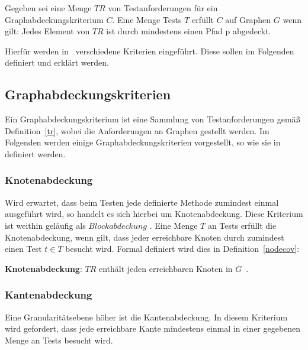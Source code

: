 \begin{definition}
    Gegeben sei eine Menge $TR$ von Testanforderungen für ein Graphabdeckungskriterium $C$.
    Eine Menge Tests $T$ erfüllt $C$ auf Graphen $G$ wenn gilt: Jedes Element von $TR$ ist durch mindestens einen Pfad p abgedeckt.
    \cite[vgl. Def. 2.32]{software-testing}
    \label{graphcov}
\end{definition}


Hierfür werden in~\cite{software-testing} verschiedene Kriterien eingeführt.
Diese sollen im Folgenden definiert und erklärt werden.

\subsection{Graphabdeckungskriterien}

Ein Graphabdeckungskriterium ist eine Sammlung von Testanforderungen gemäß Definition~\ref{tr}, wobei die Anforderungen an Graphen gestellt werden.
Im Folgenden werden einige Graphabdeckungskriterien vorgestellt, so wie sie in~\cite{software-testing} definiert werden.

\subsubsection{Knotenabdeckung}

Wird erwartet, dass beim Testen jede definierte Methode zumindest einmal ausgeführt wird, so handelt es sich hierbei um Knotenabdeckung.
Diese Kriterium ist weithin geläufig als $Blockabdeckung$ \cite[vgl. 2.2.1]{software-testing}.
Eine Menge $T$ an Tests erfüllt die Knotenabdeckung, wenn gilt, dass jeder erreichbare Knoten durch zumindest einen Test $t \in T$ besucht wird.
Formal definiert wird dies in Definition~\ref{nodecov}:

\begin{definition}
    \textbf{Knotenabdeckung}: $TR$ enthält jeden erreichbaren Knoten in $G$~\cite[vgl. Criterion 2.1]{software-testing}.
    \label{nodecov}
\end{definition}


\subsubsection{Kantenabdeckung}
\label{kantenabdeck}
Eine Granularitätsebene höher ist die Kantenabdeckung.
In diesem Kriterium wird gefordert, dass jede erreichbare Kante mindestens einmal in einer gegebenen Menge an Tests besucht wird.


